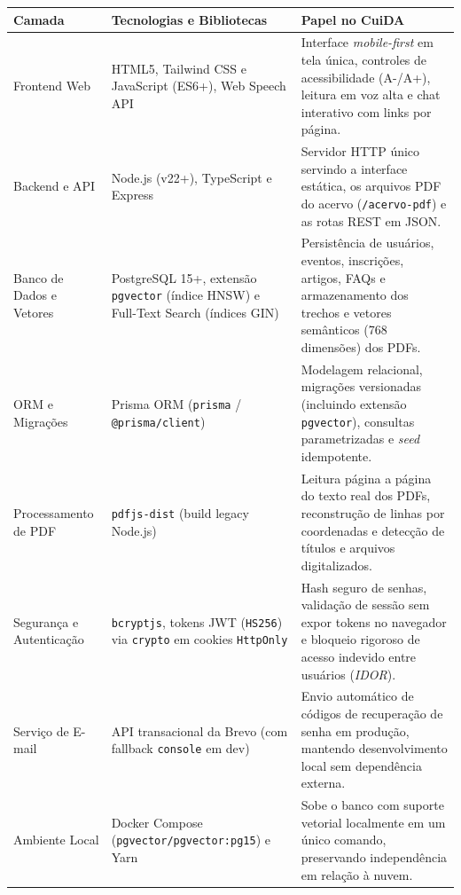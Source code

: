 \documentclass[11pt,a4paper]{article}
\begin{document}
\begin{table}[H]
  \centering
  \small
  \renewcommand{\arraystretch}{1.35}
  \begin{tabularx}{\textwidth}{|L{3.1cm}|L{4.2cm}|Y|}
    \hline
    Camada & Tecnologias e Bibliotecas & Papel no CuiDA \\
    \hline
    Frontend Web & HTML5, Tailwind CSS e JavaScript (ES6+), Web Speech API & Interface \textit{mobile-first} em tela única, controles de acessibilidade (A-/A+), leitura em voz alta e chat interativo com links por página. \\
    \hline
    Backend e API & Node.js (v22+), TypeScript e Express & Servidor HTTP único servindo a interface estática, os arquivos PDF do acervo (\texttt{/acervo-pdf}) e as rotas REST em JSON. \\
    \hline
    Banco de Dados e Vetores & PostgreSQL 15+, extensão \texttt{pgvector} (índice HNSW) e Full-Text Search (índices GIN) & Persistência de usuários, eventos, inscrições, artigos, FAQs e armazenamento dos trechos e vetores semânticos (768 dimensões) dos PDFs. \\
    \hline
    ORM e Migrações & Prisma ORM (\texttt{prisma} / \texttt{@prisma/client}) & Modelagem relacional, migrações versionadas (incluindo extensão \texttt{pgvector}), consultas parametrizadas e \textit{seed} idempotente. \\
    \hline
    Processamento de PDF & \texttt{pdfjs-dist} (build legacy Node.js) & Leitura página a página do texto real dos PDFs, reconstrução de linhas por coordenadas e detecção de títulos e arquivos digitalizados. \\
    \hline
    Segurança e Autenticação & \texttt{bcryptjs}, tokens JWT (\texttt{HS256}) via \texttt{crypto} em cookies \texttt{HttpOnly} & Hash seguro de senhas, validação de sessão sem expor tokens no navegador e bloqueio rigoroso de acesso indevido entre usuários (\textit{IDOR}). \\
    \hline
    Serviço de E-mail & API transacional da Brevo (com fallback \texttt{console} em dev) & Envio automático de códigos de recuperação de senha em produção, mantendo desenvolvimento local sem dependência externa. \\
    \hline
    Ambiente Local & Docker Compose (\texttt{pgvector/pgvector:pg15}) e Yarn & Sobe o banco com suporte vetorial localmente em um único comando, preservando independência em relação à nuvem. \\
    \hline
  \end{tabularx}
\end{table}
\end{document}
